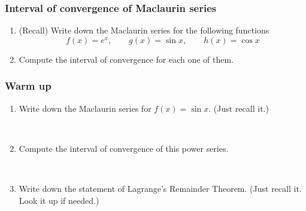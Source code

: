 \documentclass[14pt]{beamer}
\newcommand {\DS} [1] {${\displaystyle #1}$}
\begin{document}
\begin{frame}[t]
\frametitle{Interval of convergence of Maclaurin series}

\begin{enumerate}
	\item (Recall) Write down the Maclaurin series for the following functions
	$$
		f(x) = e^x, \quad \quad g(x) = \sin x, \quad \quad h(x) = \cos x
	$$

	\item Compute the interval of convergence for each one of them.
\end{enumerate}

\end{frame}
\begin{frame}[t]
\frametitle{Warm up}

\begin{enumerate}
	\item Write down the Maclaurin series for \DS{f(x)=\sin x}.
		(Just recall it.)
		
	\
	
	\item Compute the interval of convergence of this power series.
	
	\ 
	
	\item Write down the statement of Lagrange's Remainder Theorem.
		(Just recall it.  Look it up if needed.)
		
\end{enumerate}

\end{frame}
\end{document}
